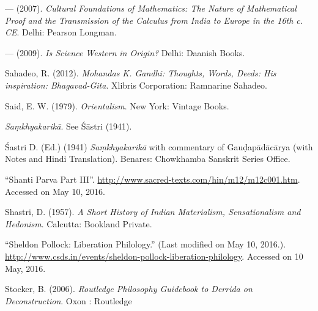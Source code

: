 \begin{thebibliography}{99}
--- (2007). {\sl Cultural Foundations of Mathematics: The Nature of Mathematical Proof and the Transmission of the Calculus from India to Europe in the 16th c. CE}. Delhi: Pearson Longman.

--- (2009). {\sl Is Science Western in Origin?} Delhi: Daanish Books.

Sahadeo, R. (2012). {\sl Mohandas K. Gandhi: Thoughts, Words, Deeds: His inspiration: Bhagavad-Gita}. Xlibris Corporation: Ramnarine Sahadeo.

Said, E. W. (1979). {\sl Orientalism}. New York: Vintage Books.

{\sl Saṃkhyakarikā}. See Śāstri (1941).

Śastri D. (Ed.) (1941) {\sl Saṃkhyakarikā} with commentary of Gauḍapādācārya (with Notes and Hindi Translation). Benares: Chowkhamba Sanskrit Series Office.

``Shanti Parva Part III''. \url{http://www.sacred-texts.com/hin/m12/m12c001.htm}. Accessed on May 10, 2016.


Shastri, D. (1957). {\sl A Short History of Indian Materialism, Sensationalism and Hedonism}. Calcutta: Bookland Private.

``Sheldon Pollock: Liberation Philology.'' (Last modified on May 10, 2016.). \url{http://www.csds.in/events/sheldon-pollock-liberation-philology}. Accessed on 10 May, 2016.

Stocker, B. (2006). {\sl Routledge Philosophy Guidebook to Derrida on Deconstruction}. Oxon : Routledge

\end{thebibliography}

\theendnotes
